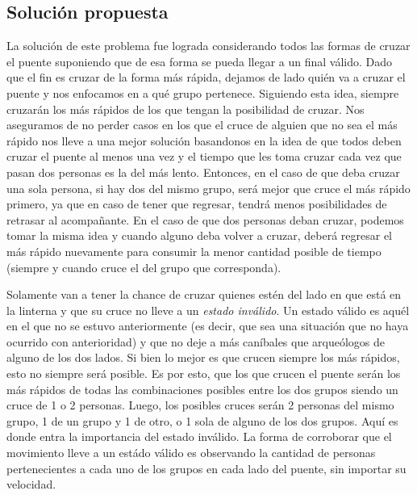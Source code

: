     \subsection{Solución propuesta}
        La solución de este problema fue lograda considerando todos las formas de cruzar el puente suponiendo que de esa forma se pueda llegar a un final válido. Dado que el fin es cruzar de la forma más rápida, dejamos de lado quién va a cruzar el puente y nos enfocamos en a qué grupo pertenece. Siguiendo esta idea, siempre cruzarán los más rápidos de los que tengan la posibilidad de cruzar. Nos aseguramos de no perder casos en los que el cruce de alguien que no sea el más rápido nos lleve a una mejor solución basandonos en la idea de que todos deben cruzar el puente al menos una vez y el tiempo que les toma cruzar cada vez que pasan dos personas es la del más lento. Entonces, en el caso de que deba cruzar una sola persona, si hay dos del mismo grupo, será mejor que cruce el más rápido primero, ya que en caso de tener que regresar, tendrá menos posibilidades de retrasar al acompañante. En el caso de que dos personas deban cruzar, podemos tomar la misma idea y cuando alguno deba volver a cruzar, deberá regresar el más rápido nuevamente para consumir la menor cantidad posible de tiempo (siempre y cuando cruce el del grupo que corresponda).

        Solamente van a tener la chance de cruzar quienes estén del lado en que está en la linterna y que su cruce no lleve a un \emph{estado inválido}. Un estado válido es aquél en el que no se estuvo anteriormente (es decir, que sea una situación que no haya ocurrido con anterioridad) y que no deje a más caníbales que arqueólogos de alguno de los dos lados. Si bien lo mejor es que crucen siempre los más rápidos, esto no siempre será posible. Es por esto, que los que crucen el puente serán los más rápidos de todas las combinaciones posibles entre los dos grupos siendo un cruce de 1 o 2 personas. Luego, los posibles cruces serán 2 personas del mismo grupo, 1 de un grupo y 1 de otro, o 1 sola de alguno de los dos grupos. Aquí es donde entra la importancia del estado inválido. La forma de corroborar que el movimiento lleve a un estádo válido es observando la cantidad de personas pertenecientes a cada uno de los grupos en cada lado del puente, sin importar su velocidad.

